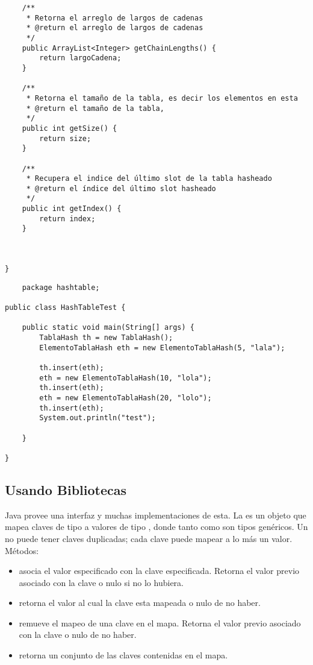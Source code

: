 \begin{lstlisting}
    /**
     * Retorna el arreglo de largos de cadenas 
     * @return el arreglo de largos de cadenas 
     */
    public ArrayList<Integer> getChainLengths() {
        return largoCadena;
    }

    /**
     * Retorna el tamaño de la tabla, es decir los elementos en esta 
     * @return el tamaño de la tabla,
     */
    public int getSize() {
        return size;
    }

    /**
     * Recupera el indice del último slot de la tabla hasheado
     * @return el índice del último slot hasheado 
     */
    public int getIndex() {
        return index;
    }
    
    

}

\end{lstlisting}

\begin{lstlisting}
    package hashtable;

public class HashTableTest {

	public static void main(String[] args) {
		TablaHash th = new TablaHash();
		ElementoTablaHash eth = new ElementoTablaHash(5, "lala");
		
		th.insert(eth);
		eth = new ElementoTablaHash(10, "lola");
		th.insert(eth);
		eth = new ElementoTablaHash(20, "lolo");
		th.insert(eth);
		System.out.println("test");

	}

}

\end{lstlisting}

\subsection{Usando Bibliotecas}
Java provee una interfaz  y muchas implementaciones de esta. La  es un objeto que mapea claves de tipo  a valores de tipo , donde tanto  como  son tipos genéricos. Un  no puede tener claves duplicadas; cada clave puede mapear a lo más un valor. Métodos:
\begin{itemize}
    \item {} asocia el valor especificado con la clave especificada. Retorna el valor previo asociado con la clave o nulo si no lo hubiera. 
\item {} retorna el valor al cual la clave esta mapeada o nulo de no haber. 
\item {} remueve el mapeo de una clave en el mapa. Retorna el valor previo asociado con la clave o nulo de no haber. 
\item {} retorna un conjunto de las claves contenidas en el mapa. 
\end{itemize}

